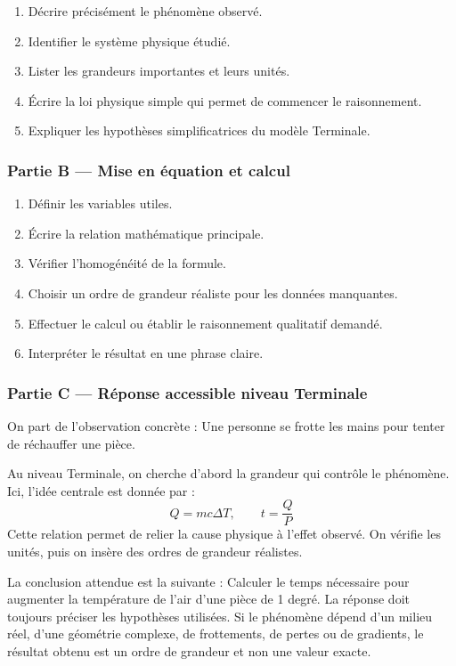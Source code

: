 \documentclass[11pt,a4paper]{article}
\begin{document}
\begin{enumerate}
  \item Décrire précisément le phénomène observé.
  \item Identifier le système physique étudié.
  \item Lister les grandeurs importantes et leurs unités.
  \item Écrire la loi physique simple qui permet de commencer le raisonnement.
  \item Expliquer les hypothèses simplificatrices du modèle Terminale.
\end{enumerate}

\subsubsection*{Partie B — Mise en équation et calcul}

\begin{enumerate}
  \item Définir les variables utiles.
  \item Écrire la relation mathématique principale.
  \item Vérifier l'homogénéité de la formule.
  \item Choisir un ordre de grandeur réaliste pour les données manquantes.
  \item Effectuer le calcul ou établir le raisonnement qualitatif demandé.
  \item Interpréter le résultat en une phrase claire.
\end{enumerate}

\subsubsection*{Partie C — Réponse accessible niveau Terminale}

\begin{corrigebox}
On part de l'observation concrète : Une personne se frotte les mains pour tenter de réchauffer une pièce.

Au niveau Terminale, on cherche d'abord la grandeur qui contrôle le phénomène. Ici, l'idée centrale est donnée par :
\[
Q=mc\Delta T,\qquad t=\frac{Q}{P}
\]
Cette relation permet de relier la cause physique à l'effet observé. On vérifie les unités, puis on insère des ordres de grandeur réalistes.

La conclusion attendue est la suivante : Calculer le temps nécessaire pour augmenter la température de l'air d'une pièce de 1 degré. La réponse doit toujours préciser les hypothèses utilisées. Si le phénomène dépend d'un milieu réel, d'une géométrie complexe, de frottements, de pertes ou de gradients, le résultat obtenu est un ordre de grandeur et non une valeur exacte.
\end{corrigebox}
\end{document}
